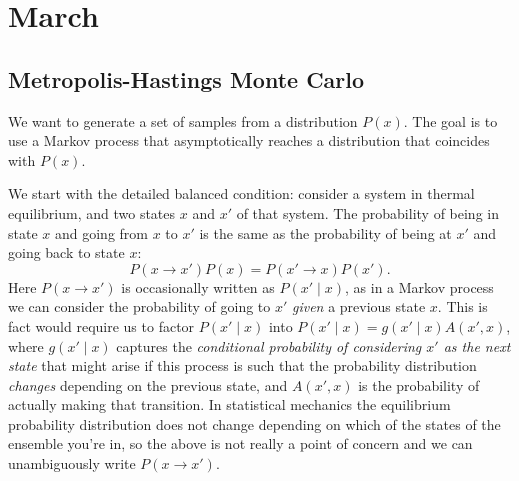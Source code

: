 \documentclass{report}
\begin{document}
\dominitoc 
\tableofcontents


\chapter{March}
\begin{tocbox}
	\minitoc
\end{tocbox}

\section{Metropolis-Hastings Monte Carlo}
We want to generate a set of samples from a distribution $ P(x) $. 
The goal is to use a Markov process that asymptotically reaches a distribution 
that coincides with $ P(x) $. 

We start with the detailed balanced condition: consider 
a system in thermal equilibrium, and two states $ x $ and $ x' $ of that system. 
The probability of being in state $ x $ and going from $ x $ to $ x' $ is the same as
the probability of being at $ x' $ and going back to state $ x $: 
\begin{equation}\label{eq:detailed-balance}
	P(x \rightarrow x') P(x) = P(x' \rightarrow x) P(x').
\end{equation}
Here $ P(x \rightarrow x') $ is occasionally written as $ P(x' \mid x) $, 
as in a Markov process we can consider the probability of going to $ x' $ 
\textit{given} a previous state $ x $. This is fact would require us to 
factor $ P(x' \mid x) $ into $ P(x' \mid x) = g(x' \mid x)A(x', x)$, 
where $ g(x' \mid x) $ captures the \textit{conditional probability of considering 
$ x' $ as the next state} that might arise if this process is such that the
probability distribution \textit{changes} depending on the previous state, and $
A(x', x) $ is the probability of actually making that transition. 
In statistical mechanics the equilibrium probability distribution does not
change depending on which of the states of the ensemble you're in, so the above is
not really a point of concern and we can unambiguously write $ P(x \rightarrow
x') $. 
\end{document}
